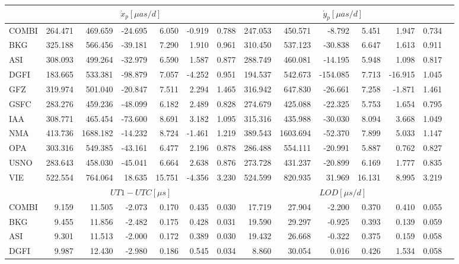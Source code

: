 \documentclass[twocolumn,twoside]{svmultivs_br} %
\begin{document}
\begin{table}[htbp!]
\begin{center}
\begin{tabularx}{\textwidth}{L|RRRRRR|RRRRRRR|}
&  & 
\\
\hline
 COMBI & 264.471 &  469.659 & -24.695 &  6.050 & -0.919 & 0.788 & 247.053 &  450.571 &   -8.792 &  5.451 &   1.947 &
 0.734 \\
 BKG & 325.188 &  566.456 & -39.181 &  7.290 &  1.910 & 0.961 & 310.450 &  537.123 &  -30.838 &  6.647 &   1.613 & 0.911
 \\
 ASI & 308.093 &  499.264 & -32.979 &  6.590 &  1.587 & 0.877 & 288.749 &  460.081 &  -14.195 &  5.948 &   1.098 & 0.817
 \\
 DGFI & 183.665 &  533.381 & -98.879 &  7.057 & -4.252 & 0.951 & 194.537 &  542.673 & -154.085 &  7.713 & -16.915 &
 1.045 \\
 GFZ & 319.974 &  501.040 & -20.847 &  7.511 &  2.294 & 1.465 & 316.942 &  647.830 &  -26.661 &  7.258 &  -1.871 & 1.461
 \\
 GSFC & 283.276 &  459.236 & -48.099 &  6.182 &  2.489 & 0.828 & 274.679 &  425.088 &  -22.325 &  5.753 &   1.654 &
 0.795 \\
 IAA & 308.771 &  465.454 & -73.600 &  8.691 &  3.182 & 1.095 & 315.316 &  435.988 &  -30.030 &  8.094 &   3.668 & 1.049
 \\
 NMA & 413.736 & 1688.182 & -14.232 &  8.724 & -1.461 & 1.219 & 389.543 & 1603.694 &  -52.370 &  7.899 &   5.033 & 1.147
 \\
 OPA & 303.316 &  549.385 & -43.161 &  6.477 &  2.196 & 0.878 & 286.488 &  554.111 &  -20.991 &  5.887 &   0.762 & 0.827
 \\
 USNO & 283.643 &  458.030 & -45.041 &  6.664 &  2.638 & 0.876 & 273.728 &  431.237 &  -20.899 &  6.169 &   1.777 &
 0.835 \\
 VIE & 522.554 &  764.064 &  18.635 & 15.751 & -4.356 & 3.230 & 524.599 &  820.935 &   31.969 & 16.131 &   8.995 & 3.219
 \\
\hline\hline
&  &   \\
\hline
COMBI & 9.159 & 11.505 & -2.073 & 0.170 &  0.435 & 0.030 & 17.719 & 27.904 & -2.200 & 0.370 & 0.410 & 0.055 \\
  BKG &   9.455 & 11.856 & -2.482 & 0.175 &  0.428 & 0.031 & 19.590 & 29.297 & -0.925 & 0.393 & 0.139 & 0.059 \\
  ASI &   9.301 & 11.513 & -2.000 & 0.172 &  0.389 & 0.030 & 19.432 & 26.668 & -0.322 & 0.375 & 0.159 & 0.058 \\
 DGFI &   9.987 & 12.430 & -2.980 & 0.186 &  0.545 & 0.034 &  8.860 & 30.054 &  0.016 & 0.426 & 1.534 & 0.058 \\

\end{tabularx}
\end{center}
\end{table}
\end{document}

